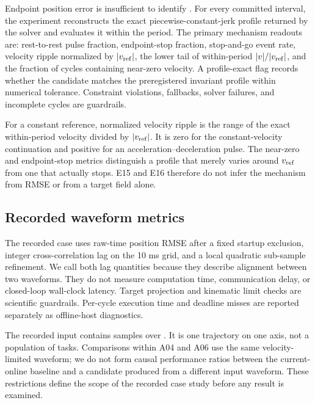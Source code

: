 Endpoint position error is insufficient to identify \stopandgo. For every committed interval, the experiment reconstructs the exact piecewise-constant-jerk profile returned by the solver and evaluates it within the period. The primary mechanism readouts are: rest-to-rest pulse fraction, endpoint-stop fraction, stop-and-go event rate, velocity ripple normalized by $\lvert v_{\mathrm{ref}}\rvert$, the lower tail of within-period $\lvert v\rvert/\lvert v_{\mathrm{ref}}\rvert$, and the fraction of cycles containing near-zero velocity. A profile-exact flag records whether the candidate matches the preregistered invariant profile within numerical tolerance. Constraint violations, fallbacks, solver failures, and incomplete cycles are guardrails.

For a constant reference, normalized velocity ripple is the range of the exact within-period velocity divided by $\lvert v_{\mathrm{ref}}\rvert$. It is zero for the constant-velocity continuation and positive for an acceleration--deceleration pulse. The near-zero and endpoint-stop metrics distinguish a profile that merely varies around $v_{\mathrm{ref}}$ from one that actually stops. E15 and E16 therefore do not infer the mechanism from RMSE or from a target field alone.

\subsection{Recorded waveform metrics}

The recorded case uses raw-time position RMSE after a fixed startup exclusion, integer cross-correlation lag on the 10 ms grid, and a local quadratic sub-sample refinement. We call both lag quantities \observedlag{} because they describe alignment between two waveforms. They do not measure computation time, communication delay, or closed-loop wall-clock latency. Target projection and kinematic limit checks are scientific guardrails. Per-cycle execution time and deadline misses are reported separately as offline-host diagnostics.

The recorded input contains \RecordedSampleCount{} samples over \RecordedDuration. It is one trajectory on one axis, not a population of tasks. Comparisons within A04 and A06 use the same velocity-limited waveform; we do not form causal performance ratios between the current-online baseline and a candidate produced from a different input waveform. These restrictions define the scope of the recorded case study before any result is examined.

